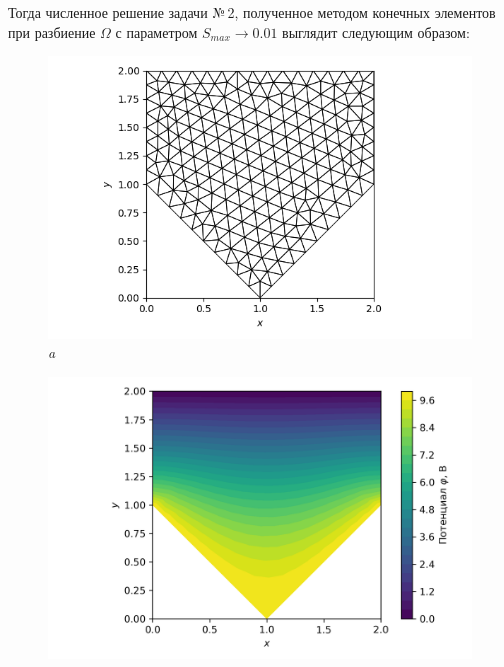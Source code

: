 \documentclass[12pt, a4paper]{article}
\begin{document}
			Тогда численное решение задачи №\,2, полученное методом конечных элементов при разбиение $\Omega$ с параметром $S_{max} \rightarrow 0.01$ выглядит следующим образом: 

			
			\begin{figure}[h]       
				\begin{center} 
					{ 
						\begin{minipage}{0.47\textwidth} 
							\centering 
							\hspace*{-21.5mm}
							\includegraphics[width=1.4\columnwidth]{Test_domain_4_mesh001_calfem_net_1.png}\\
							\hspace*{-12.5mm}
							\textit{a} 
						\end{minipage}                                 
					} 
					{ 
						\begin{minipage}{0.47\textwidth} 
							\centering 
							\hspace*{-17.5mm}
							\includegraphics[width=1.4\columnwidth]{Test_domain_4_mesh001_calfem.png}\\

\end{minipage}}
\end{center}
\end{figure}
\end{document}
